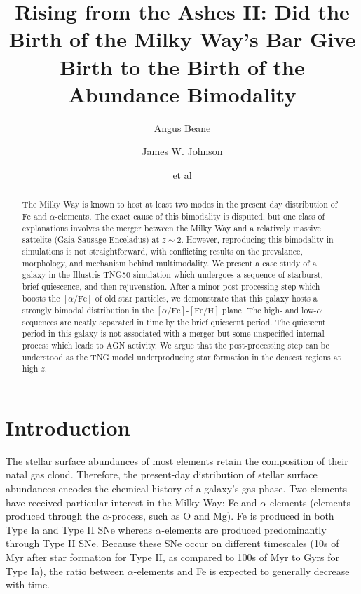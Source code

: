 \documentclass[linenumbers, twocolumn]{aastex631}
\newcommand{\FeH}{\ensuremath{[\textrm{Fe}/\textrm{H}]}}
\newcommand{\alphaFe}{\ensuremath{[\alpha/\textrm{Fe}]}}
\begin{document}
\title{Rising from the Ashes II: Did the Birth of the Milky Way's Bar Give Birth to the Birth of the Abundance Bimodality}

\author{Angus Beane}

\author{James W. Johnson}

\author{et al}

\begin{abstract}
    The Milky Way is known to host at least two modes in the present day distribution of Fe and $\alpha$-elements. The exact cause of this bimodality is disputed, but one class of explanations involves the merger between the Milky Way and a relatively massive sattelite (Gaia-Sausage-Enceladus) at $z\sim2$. However, reproducing this bimodality in simulations is not straightforward, with conflicting results on the prevalance, morphology, and mechanism behind multimodality. We present a case study of a galaxy in the Illustris TNG50 simulation which undergoes a sequence of starburst, brief quiescence, and then rejuvenation. After a minor post-processing step which boosts the \alphaFe{} of old star particles, we demonstrate that this galaxy hosts a strongly bimodal distribution in the \alphaFe{}-\FeH{} plane. The high- and low-$\alpha$ sequences are neatly separated in time by the brief quiescent period. The quiescent period in this galaxy is not associated with a merger but some unspecified internal process which leads to AGN activity. We argue that the post-processing step can be understood as the TNG model underproducing star formation in the densest regions at high-$z$.
  \end{abstract}
    
  

\section{Introduction}\label{sec:intro}
The stellar surface abundances of most elements retain the composition of their natal gas cloud. Therefore, the present-day distribution of stellar surface abundances encodes the chemical history of a galaxy's gas phase. Two elements have received particular interest in the Milky Way: Fe and $\alpha$-elements (elements produced through the $\alpha$-process, such as O and Mg). Fe is produced in both Type Ia and Type II SNe whereas $\alpha$-elements are produced predominantly through Type II SNe. Because these SNe occur on different timescales (10s of Myr after star formation for Type II, as compared to 100s of Myr to Gyrs for Type Ia), the ratio between $\alpha$-elements and Fe is expected to generally decrease with time.
\end{document}
